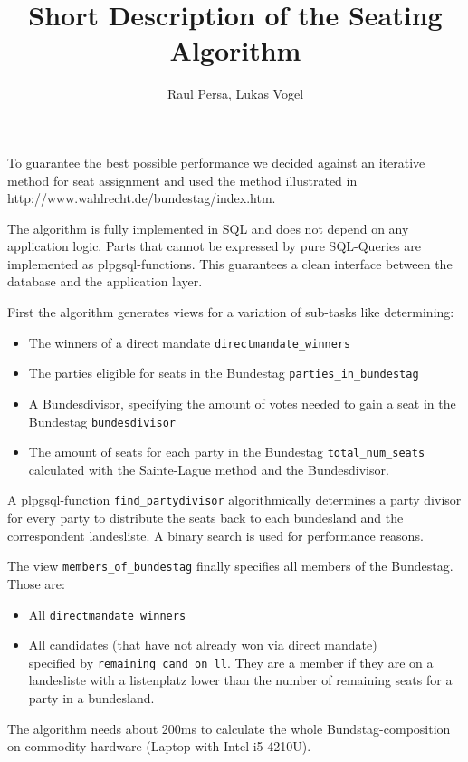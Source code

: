 \documentclass[10pt,a4paper]{article}
\author{Raul Persa, Lukas Vogel}
\title{Short Description of the Seating Algorithm}
\begin{document}
\maketitle

To guarantee the best possible performance we decided against an iterative method for seat assignment and used the method illustrated in \\ http://www.wahlrecht.de/bundestag/index.htm.

The algorithm is fully implemented in SQL and does not depend on any application logic. Parts that cannot be expressed by pure SQL-Queries are implemented as plpgsql-functions. This guarantees a clean interface between the database and the application layer.

First the algorithm generates views for a variation of sub-tasks like determining:
\begin{itemize}
		\item The winners of a direct mandate \verb|directmandate_winners|
		\item The parties eligible for seats in the Bundestag \verb|parties_in_bundestag|
		\item A Bundesdivisor, specifying the amount of votes needed to gain a seat in the Bundestag \verb|bundesdivisor|
		\item The amount of seats for each party in the Bundestag \verb|total_num_seats| calculated with the Sainte-Lague method and the Bundesdivisor.
\end{itemize}

A plpgsql-function \verb|find_partydivisor| algorithmically determines a party divisor for every party to distribute the seats back to each bundesland and the correspondent landesliste. 
A binary search is used for performance reasons.

The view \verb|members_of_bundestag| finally specifies all members of the Bundestag. Those are:

\begin{itemize}
	\item All \verb|directmandate_winners|
	\item All candidates (that have not already won via direct mandate) \\
	 specified by \verb|remaining_cand_on_ll|.
	 They are a member if they are on a landesliste with a listenplatz lower than the number of remaining seats for a party in a bundesland.
\end{itemize}


The algorithm needs about 200ms to calculate the whole Bundstag-composition on commodity hardware (Laptop with Intel i5-4210U).
\end{document}
